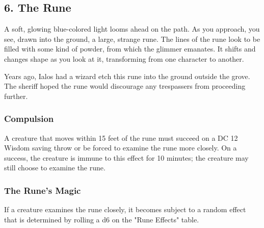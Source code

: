 \documentclass[10pt,a4paper,twoside,bg=print,twocolumn,openany,nodeprecatedcode]{dndbook}
\begin{document}
\subsection{6. The Rune}
\begin{DndReadAloud}{}
A soft, glowing blue-colored light looms ahead on the path. As you approach, you see, drawn into the ground, a large, strange rune. The lines of the rune look to be filled with some kind of powder, from which the glimmer emanates. It shifts and changes shape as you look at it, transforming from one character to another.

\end{DndReadAloud}

Years ago, Ialos had a wizard etch this rune into the ground outside the grove. The sheriff hoped the rune would discourage any trespassers from proceeding further.

\subsubsection{Compulsion}
A creature that moves within 15 feet of the rune must succeed on a DC 12 Wisdom saving throw or be forced to examine the rune more closely. On a success, the creature is immune to this effect for 10 minutes; the creature may still choose to examine the rune.

\subsubsection{The Rune's Magic}
If a creature examines the rune closely, it becomes subject to a random effect that is determined by rolling a d6 on the "Rune Effects" table.
\end{document}
